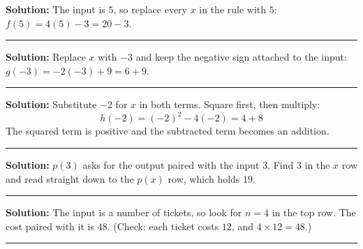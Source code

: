 \documentclass[12pt]{article}
\begin{document}



\textbf{Solution:} \quad The input is $5$, so replace every $x$ in the rule with $5$:
$f(5) = 4(5) - 3 = 20 - 3$. 

\vspace{0.25cm}

\noindent\rule{\linewidth}{0.2pt}


\textbf{Solution:} \quad Replace $x$ with $-3$ and keep the negative sign attached to the input:
$g(-3) = -2(-3) + 9 = 6 + 9$. 

\vspace{0.25cm}

\noindent\rule{\linewidth}{0.2pt}


\textbf{Solution:} \quad Substitute $-2$ for $x$ in both terms. Square first, then multiply:
\[ h(-2) = (-2)^2 - 4(-2) = 4 + 8 \]
The squared term is positive and the subtracted term becomes an addition. 

\vspace{0.25cm}

\noindent\rule{\linewidth}{0.2pt}


\textbf{Solution:} \quad $p(3)$ asks for the output paired with the input $3$. Find $3$ in the
$x$ row and read straight down to the $p(x)$ row, which holds $19$. 

\vspace{0.25cm}

\noindent\rule{\linewidth}{0.2pt}


\textbf{Solution:} \quad The input is a number of tickets, so look for $n = 4$ in the top row.
The cost paired with it is $48$. (Check: each ticket costs $12$, and $4 \times 12 = 48$.)

\vspace{0.25cm}

\noindent\rule{\linewidth}{0.2pt}
\end{document}
